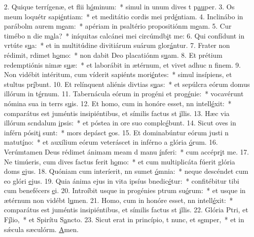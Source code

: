 2. Quique terrígenæ, et flii h\uline{ó}minum:~* simul in unum dives t p\uline{au}per.
3. Os meum loquétr sapi\uline{é}ntiam:~* et meditátio cordis mei prd\uline{é}ntiam.
4. Inclinábo in parábolm aurem m\uline{e}am:~* apériam in psaltério propositiónm m\uline{e}am.
5. Cur timébo n die m\uline{a}la?~* iníquitas calcánei mei circúmdb\uline{i}t me:
6. Qui confídunt in vrtúte s\uline{u}a:~* et in multitúdine divitiárum suárum glor\uline{á}ntur.
7. Frater non rédimit, rdimet h\uline{o}mo:~* non dabit Deo placatiónm s\uline{u}am.
8. Et prétium redemptiónis nimæ s\uline{u}æ:~* et laborábit in ætérnum, et vivet adhuc n f\uline{i}nem.
9. Non vidébit intéritum, cum víderit sapiénts mori\uline{é}ntes:~* simul insípiens, et stultus pr\uline{í}bunt.
10. Et relínquent aliénis divtias s\uline{u}as:~* et sepúlcra eórum domus illórum in t\uline{é}rnum.
11. Tabernácula eórum in progéni et prog\uline{é}nie:~* vocavérunt nómina sua in terrs s\uline{u}is.
12. Et homo, cum in honóre esset, nn intell\uline{é}xit:~* comparátus est juméntis insipiéntibus, et símilis factus st \uline{i}llis.
13. Hæc via illórum scndalum \uline{i}psis:~* et póstea in ore suo complc\uline{é}bunt.
14. Sicut oves in inférn pósit\uline{i} sunt:~* mors depásct \uline{e}os.
15. Et dominabúntur eórum justi n matut\uline{í}no:~* et auxílium eórum veteráscet in inférno a glória \uline{ó}rum.
16. Verúmtamen Deus rédimet ánimam meam d manu \uline{í}nferi:~* cum accépr\uline{i}t me.
17. Ne timúeris, cum dives factus ferit h\uline{o}mo:~* et cum multiplicáta fúerit glória doms \uline{e}jus.
18. Quóniam cum interíerit, nn sumet \uline{ó}mnia:~* neque descéndet cum eo glóri \uline{e}jus.
19. Quia ánima ejus in vita ipsíus bnedic\uline{é}tur:~* confitébitur tibi cum benefécers \uline{e}i.
20. Introíbit usque in progénies ptrum su\uline{ó}rum:~* et usque in ætérnum non vidébt l\uline{u}men.
21. Homo, cum in honóre esset, nn intell\uline{é}xit:~* comparátus est juméntis insipiéntibus, et símilis factus st \uline{i}llis.
22. Glória Ptri, et F\uline{í}lio,~* et Spirítu S\uline{a}ncto.
23. Sicut erat in princípio, t nunc, et s\uline{e}mper,~* et in sǽcula sæculórm. \uline{A}men.
